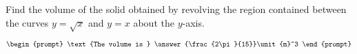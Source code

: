 \documentclass{ximera}
\author{Gregory Hartman \and Matthew Carr}
\begin{document}
\begin{exercise}






Find the volume of the solid obtained by revolving the region contained between the curves $y=\sqrt{x}$ and $y=x$ about the $y$-axis.

\[
\begin{prompt}
\text{The volume is } \answer{\frac{2\pi}{15}}\unit{m}^3
\end{prompt}
\]




\end{exercise}
\end{document}
